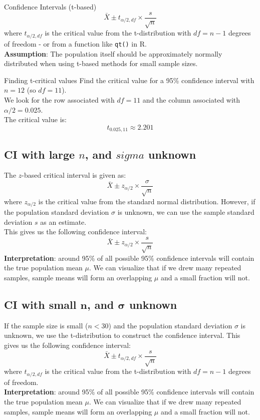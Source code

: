\documentclass[10pt, total={6in, 8in}]{extarticle}
\begin{document}
\begin{definitionbox}{Confidence Intervals (t-based)}{}
    $$\bar{X} \pm t_{\alpha/2, df} \times \frac{s}{\sqrt{n}}$$
    where $t_{\alpha/2, df}$ is the critical value from the t-distribution with $df = n - 1$ degrees of freedom - or from a function like \texttt{qt()} in R.\\

    \textbf{Assumption}: The population itself should be approximately normally distributed when using t-based methods for small sample sizes.
\end{definitionbox}

\begin{examplebox}{Finding t-critical values}{}
    Find the critical value for a 95\% confidence interval with $n = 12$ (so $df = 11$).\\
    We look for the row associated with $df = 11$ and the column associated with $\alpha/2 = 0.025$.\\
    The critical value is:
    $$t_{0.025, 11} \approx 2.201$$
\end{examplebox}

\subsection{CI with large $n$, and $sigma$ unknown}
The $z$-based critical interval is given as:
$$\bar{X} \pm z_{\alpha/2} \times \frac{\sigma}{\sqrt{n}}$$
where $z_{\alpha/2}$ is the critical value from the standard normal distribution.
However, if the population standard deviation $\sigma$ is unknown, we can use the sample standard deviation $s$ as an estimate.\\
This gives us the following confidence interval:
$$\bar{X} \pm z_{\alpha/2} \times \frac{s}{\sqrt{n}}$$
\textbf{Interpretation}: around 95\% of all possible 95\% confidence intervals will contain the true population mean $\mu$. We can visualize that if we drew many repeated samples, sample means will form an overlapping $\mu$ and a small fraction will not.

\subsection{CI with small $\boldsymbol{n}$, and $\boldsymbol{\sigma}$ unknown}
If the sample size is small ($n < 30$) and the population standard deviation $\sigma$ is unknown, we use the t-distribution to construct the confidence interval. This gives us the following confidence interval:
$$\bar{X} \pm t_{\alpha/2, df} \times \frac{s}{\sqrt{n}}$$
where $t_{\alpha/2, df}$ is the critical value from the t-distribution with $df = n - 1$ degrees of freedom.\\
\textbf{Interpretation}: around 95\% of all possible 95\% confidence intervals will contain the true population mean $\mu$. We can visualize that if we drew many repeated samples, sample means will form an overlapping $\mu$ and a small fraction will not.
\end{document}
